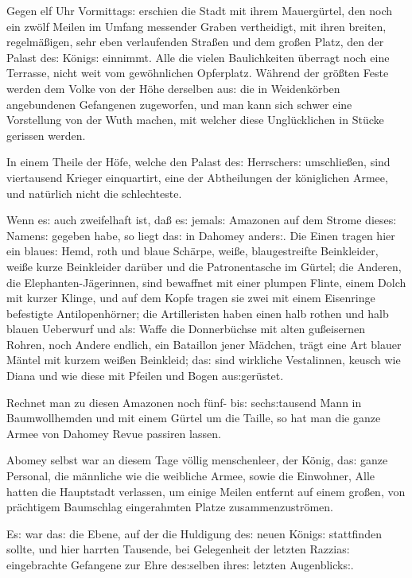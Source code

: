 \documentclass[oneside,12pt]{book}
\newcommand{\s}{s:}
\begin{document}
Gegen elf Uhr Vormittag{\s} erschien die Stadt mit ihrem
Mauerg\"urtel, den noch ein zw\"olf Meilen im Umfang messender Graben
vertheidigt, mit ihren breiten, regelm\"a{\ss}igen, sehr eben
verlaufenden Stra{\ss}en und dem gro{\ss}en Platz, den der Palast
de{\s} K\"onig{\s} einnimmt. Alle die vielen Baulichkeiten \"uberragt
noch eine Terrasse, nicht weit vom gew\"ohnlichen Opferplatz.
W\"ahrend der gr\"o{\ss}ten Feste werden dem Volke von der H\"ohe
derselben au{\s} die in Weidenk\"orben angebundenen Gefangenen
zugeworfen, und man kann sich schwer eine Vorstellung von der Wuth
machen, mit welcher diese Ungl\"ucklichen in St\"ucke gerissen
werden.

In einem Theile der H\"ofe, welche den Palast de{\s} Herrscher{\s}
umschlie{\ss}en, sind viertausend Krieger einquartirt, eine der
Abtheilungen der k\"oniglichen Armee, und nat\"urlich nicht die
schlechteste.

Wenn e{\s} auch zweifelhaft ist, da{\ss} e{\s} jemal{\s} Amazonen auf
dem Strome diese{\s} Namen{\s} gegeben habe, so liegt da{\s} in
Dahomey ander{\s}. Die Einen tragen hier ein blaue{\s} Hemd, roth und
blaue Sch\"arpe, wei{\ss}e, blaugestreifte Beinkleider, wei{\ss}e
kurze Beinkleider dar\"uber und die Patronentasche im G\"urtel; die
Anderen, die Elephanten-J\"agerinnen, sind bewaffnet mit einer
plumpen Flinte, einem Dolch mit kurzer Klinge, und auf dem Kopfe
tragen sie zwei mit einem Eisenringe befestigte Antilopenh\"orner;
die Artilleristen haben einen halb rothen und halb blauen Ueberwurf
und al{\s} Waffe die Donnerb\"uchse mit alten gu{\ss}eisernen Rohren,
noch Andere endlich, ein Bataillon jener M\"adchen, tr\"agt eine Art
blauer M\"antel mit kurzem wei{\ss}en Beinkleid; da{\s} sind
wirkliche Vestalinnen, keusch wie Diana und wie diese mit Pfeilen und
Bogen au{\s}ger\"ustet.

Rechnet man zu diesen Amazonen noch f\"unf- bi{\s} sech{\s}tausend
Mann in Baumwollhemden und mit einem G\"urtel um die Taille, so hat
man die ganze Armee von Dahomey Revue passiren lassen.

Abomey selbst war an diesem Tage v\"ollig menschenleer, der K\"onig,
da{\s} ganze Personal, die m\"annliche wie die weibliche Armee, sowie
die Einwohner, Alle hatten die Hauptstadt verlassen, um einige Meilen
entfernt auf einem gro{\ss}en, von pr\"achtigem Baumschlag
eingerahmten Platze zusammenzustr\"omen.

E{\s} war da{\s} die Ebene, auf der die Huldigung de{\s} neuen
K\"onig{\s} stattfinden sollte, und hier harrten Tausende, bei
Gelegenheit der letzten Razzia{\s} eingebrachte Gefangene zur Ehre
de{\s}selben ihre{\s} letzten Augenblick{\s}.
\end{document}
